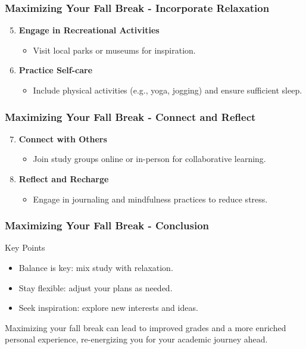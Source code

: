 \documentclass[aspectratio=169]{beamer}
\begin{document}
\begin{frame}[fragile]
    \frametitle{Maximizing Your Fall Break - Incorporate Relaxation}
    \begin{enumerate}
        \setcounter{enumi}{4}
        \item \textbf{Engage in Recreational Activities}
        \begin{itemize}
            \item Visit local parks or museums for inspiration.
        \end{itemize}
        
        \item \textbf{Practice Self-care}
        \begin{itemize}
            \item Include physical activities (e.g., yoga, jogging) and ensure sufficient sleep.
        \end{itemize}
    \end{enumerate}
\end{frame}

\begin{frame}[fragile]
    \frametitle{Maximizing Your Fall Break - Connect and Reflect}
    \begin{enumerate}
        \setcounter{enumi}{6}
        \item \textbf{Connect with Others}
        \begin{itemize}
            \item Join study groups online or in-person for collaborative learning.
        \end{itemize}
        
        \item \textbf{Reflect and Recharge}
        \begin{itemize}
            \item Engage in journaling and mindfulness practices to reduce stress.
        \end{itemize}
    \end{enumerate}
\end{frame}

\begin{frame}[fragile]
    \frametitle{Maximizing Your Fall Break - Conclusion}
    \begin{block}{Key Points}
        \begin{itemize}
            \item Balance is key: mix study with relaxation.
            \item Stay flexible: adjust your plans as needed.
            \item Seek inspiration: explore new interests and ideas.
        \end{itemize}
    \end{block}
    Maximizing your fall break can lead to improved grades and a more enriched personal experience, re-energizing you for your academic journey ahead.
\end{frame}
\end{document}
